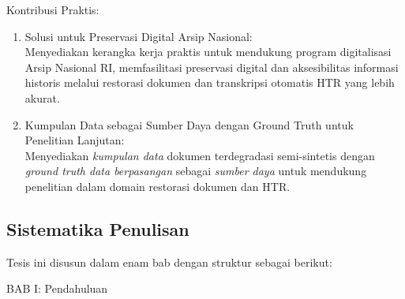 \vspace{0.5em}



Kontribusi Praktis:
\begin{enumerate}[label=\arabic*., leftmargin=1cm]
    \item Solusi untuk Preservasi Digital Arsip Nasional: \\
    Menyediakan kerangka kerja praktis untuk mendukung program digitalisasi Arsip Nasional RI, memfasilitasi preservasi digital dan aksesibilitas informasi historis melalui restorasi dokumen dan transkripsi otomatis HTR yang lebih akurat.

    \item Kumpulan Data sebagai Sumber Daya dengan Ground Truth untuk Penelitian Lanjutan: \\
    Menyediakan \textit{kumpulan data} dokumen terdegradasi semi-sintetis dengan \textit{ground truth data berpasangan} sebagai \textit{sumber daya} untuk mendukung penelitian dalam domain restorasi dokumen dan HTR.
\end{enumerate}

\vspace{0.8em}
\subsection{Sistematika Penulisan}
\label{subsec:sistematika}

Tesis ini disusun dalam enam bab dengan struktur sebagai berikut:

\vspace{0.5em}
BAB I: Pendahuluan

